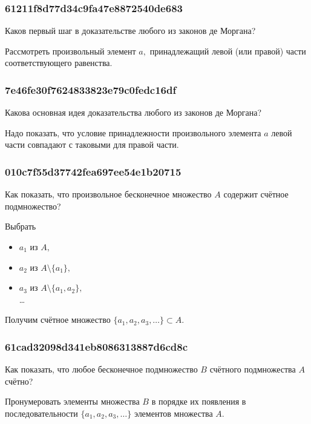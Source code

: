 \documentclass[11pt, a5paper]{article}
\newenvironment{note}[1]{\goodbreak\par\subsubsection{\hfill \color{lightgray}\tiny #1}}{}
\newenvironment{cloze}[2][\ldots]{\begin{leftbar}}{\end{leftbar}}
\begin{document}
    \begin{note}{61211f8d77d34c9fa47e8872540de683}
        Каков первый шаг в доказательстве любого из законов де Моргана?

        \begin{cloze}{1}
            Рассмотреть произвольный элемент \( a, \) принадлежащий левой (или
            правой) части соответствующего равенства.
        \end{cloze}
    \end{note}


    \begin{note}{7e46fe30f7624833823e79c0fedc16df}
        Какова основная идея доказательства любого из законов де Моргана?

        \begin{cloze}{1}
            Надо показать, что условие принадлежности произвольного элемента \( a \)
            левой части совпадают с таковыми для правой части.
        \end{cloze}
    \end{note}

    \begin{note}{010c7f55d37742fea697ee54e1b20715}
        Как показать, что произвольное бесконечное множество \( A \) содержит
        счётное подмножество?

        \begin{cloze}{1}
            Выбрать
            \begin{itemize}
                \item \( a_1 \) из \( A, \)
                \item \( a_2 \) из \( A \setminus \{ a_1 \}, \)
                \item \( a_3 \) из \( A \setminus \{ a_1, a_2 \}, \) \\
                    \dots
            \end{itemize}
            Получим счётное множество \( \{ a_1, a_2, a_3, \ldots \} \subset A.
            \)
        \end{cloze}
    \end{note}

    \begin{note}{61cad32098d341eb8086313887d6cd8c}
        Как показать, что любое бесконечное подмножество \( B \) счётного
        подмножества \( A \) счётно?

        \begin{cloze}{1}
            Пронумеровать элементы множества \( B \) в порядке их появления в
            последовательности \( \{ a_1, a_2, a_3, \ldots  \} \) элементов
            множества \( A. \)
        \end{cloze}
    \end{note}
\end{document}
